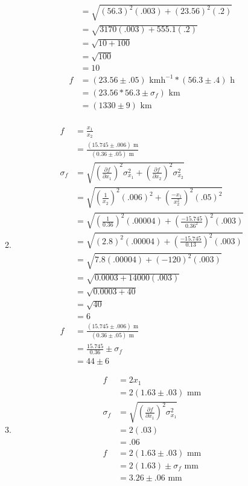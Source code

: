 \documentclass{article}
\begin{document}
\begin{enumerate}
\begin{enumerate}
\begin{align*}
&= \sqrt{(56.3)^2(.003) + (23.56)^2(.2)}\\
&= \sqrt{3170(.003) + 555.1(.2)}\\
&= \sqrt{10 + 100}\\
&= \sqrt{100}\\
&= 10\\
f &= (23.56 \pm .05)\text{ kmh}^{-1} * (56.3 \pm .4)\text{ h}\\
&= (23.56 * 56.3 \pm \sigma_{f})\text{ km}\\
&= (1330 \pm 9)\text{ km}\\
\end{align*}
\item
\begin{align*}
f &= \frac{x_1}{x_2}\\
&= \frac{(15.745 \pm .006)\text{ m}}{(0.36 \pm .05)\text{ m}}\\
\sigma_{f} &= \sqrt{(\frac{\partial f}{\partial x_1})^2\sigma_{x_1}^2 + (\frac{\partial f}{\partial x_2})^2\sigma_{x_2}^2}\\
&= \sqrt{(\frac1{x_2})^2(.006)^2 + (\frac{-x_1}{x_2^2})^2(.05)^2}\\
&= \sqrt{(\frac1{0.36})^2(.00004) + (\frac{-15.745}{0.36^2})^2(.003)}\\
&= \sqrt{(2.8)^2(.00004) + (\frac{-15.745}{0.13})^2(.003)}\\
&= \sqrt{7.8(.00004) + (-120)^2(.003)}\\
&= \sqrt{0.0003 + 14000(.003)}\\
&= \sqrt{0.0003 + 40}\\
&= \sqrt{40}\\
&= 6\\
f &= \frac{(15.745 \pm .006)\text{ m}}{(0.36 \pm .05)\text{ m}}\\
&= \frac{15.745}{0.36} \pm \sigma_{f}\\
&= 44 \pm 6
\end{align*}
\item
\begin{align*}
f &= 2x_1\\
&= 2(1.63 \pm .03)\text{ mm}\\
\sigma_{f} &= \sqrt{(\frac{\partial f}{\partial x_1})^2\sigma_{x_1}^2}\\
&= 2(.03)\\
&= .06\\
f &= 2(1.63 \pm .03)\text{ mm}\\
&= 2(1.63) \pm \sigma_{f}\text{ mm}\\
&= 3.26 \pm .06\text{ mm}\\

\end{align*}
\end{enumerate}
\end{enumerate}
\end{document}
